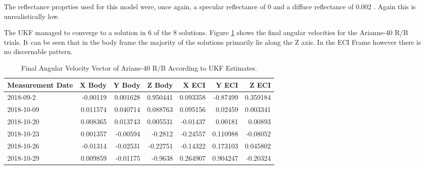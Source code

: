 The reflectance proprties used for this model were, once again, a specular reflectance of 0 and a diffuce reflectance of 0.002 . Again this is unrealistically low.

The UKF managed to converge to a solution in 6 of the 8 solutions. Figure \ref{ariane_table} shows the final angular velocities for the Arianne-40 R/B trials. It can be seen that in the body frame the majority of the solutions primarily lie along the Z axis. In the ECI Frame however there is no discernable pattern. 

\begin{table}[htbp]\label{ariane_table}
	\centering
	
	\begin{tabular}{| l | r | r | r | r| r | r |}
		\hline Measurement Date & X Body & Y Body & Z Body & X ECI & Y ECI & Z ECI \\
		\hline 2018-09-2 & -0.00119 & 0.001628 & 0.950441 & 0.093358 & -0.87499 & 0.359184 \\
		\hline 2018-10-09 & 0.011574 & 0.040714 & 0.088763 & 0.095156 & 0.02459 & 0.003341 \\
		\hline 2018-10-20 & 0.008365 & 0.013743 & 0.005531 & -0.01437 & 0.00181 & 0.00893 \\
		\hline 2018-10-23 & 0.001357 & -0.00594 & -0.2812 & -0.24557 & 0.110988 & -0.08052 \\
		\hline 2018-10-26 & -0.01314 & -0.02531 & -0.22751 & -0.14322 & 0.173103 & 0.045802 \\
		\hline 2018-10-29 & 0.009859 & -0.01175 & -0.9638 & 0.264907 & 0.904247 & -0.20324 \\
		\hline 
	\end{tabular}%
	\caption{Final Angular Velocity Vector of Ariane-40 R/B According to UKF Estimates.}
\end{table}%
